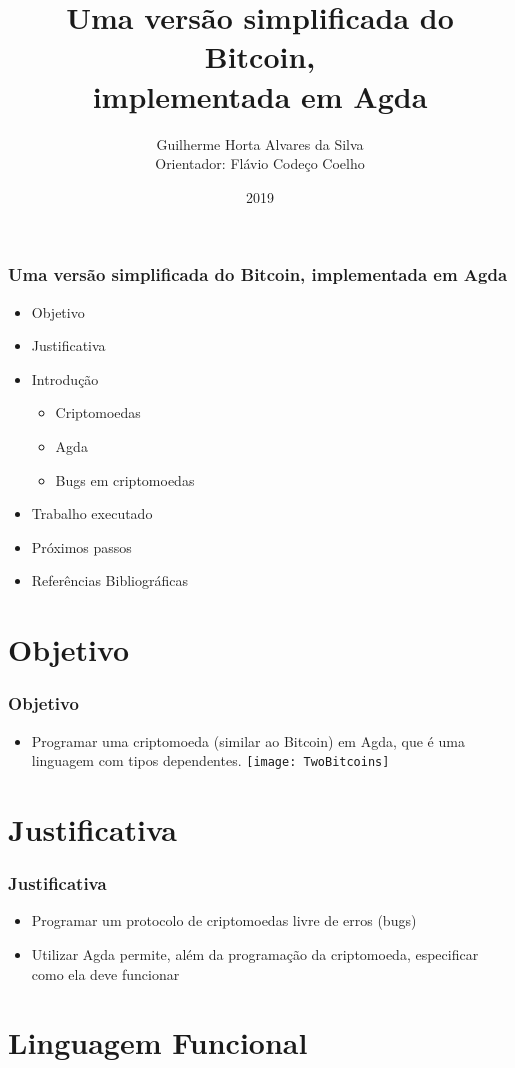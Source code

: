 \documentclass{beamer}
\title{Uma versão simplificada do Bitcoin, \\
  implementada em Agda}
\author[Guilherme, Flávio]{Guilherme Horta Alvares da Silva \\
  Orientador: Flávio Codeço Coelho}
\institute{Fundação Getulio Vargas}
\date{2019}
\begin{document}
 
\frame{\titlepage}

\begin{frame}
  \frametitle{Uma versão simplificada do Bitcoin, implementada em Agda}
\begin{itemize}
  \item Objetivo
  \item Justificativa
  \item Introdução
  \begin{itemize}
    \item Criptomoedas
    \item Agda
    \item Bugs em criptomoedas
  \end{itemize}
  \item Trabalho executado
  \item Próximos passos
  \item Referências Bibliográficas
\end{itemize}
\end{frame}

\section{Objetivo}

 \begin{frame}
\frametitle{Objetivo}
\begin{itemize}
  \item Programar uma criptomoeda (similar ao Bitcoin) em Agda, que é uma linguagem com tipos dependentes.
    \texttt{[image: TwoBitcoins]}
\end{itemize}
\end{frame}
 
\section{Justificativa}

\begin{frame}
\frametitle{Justificativa}
\begin{itemize}
    \item Programar um protocolo de criptomoedas livre de erros (bugs)
    \item Utilizar Agda permite, além da programação da criptomoeda, especificar como ela deve funcionar
      \cite{norell2008dependently}
\end{itemize}
\end{frame}

\section{Linguagem Funcional}
\end{document}
